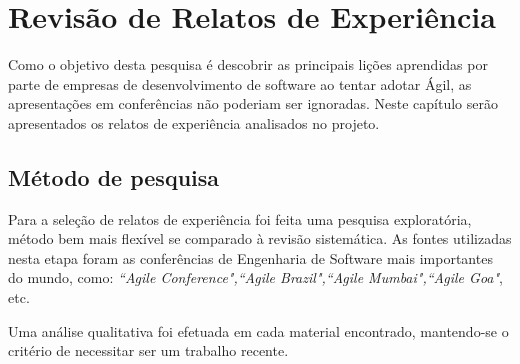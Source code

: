 \chapter{Revisão de Relatos de Experiência}
	Como o objetivo desta pesquisa é descobrir as principais lições aprendidas por parte de empresas de desenvolvimento de software ao tentar adotar Ágil, as apresentações em conferências não poderiam ser ignoradas. Neste capítulo serão apresentados os relatos de experiência analisados no projeto.
	\section{Método de pesquisa}
	Para a seleção de relatos de experiência foi feita uma pesquisa exploratória, método bem mais flexível se comparado à revisão sistemática. As fontes utilizadas nesta etapa foram as conferências de Engenharia de Software mais importantes do mundo, como: \textit{``Agile Conference",``Agile Brazil",``Agile Mumbai",``Agile Goa"}, etc.

	Uma análise qualitativa foi efetuada em cada material encontrado, mantendo-se o critério de necessitar ser um trabalho recente.
